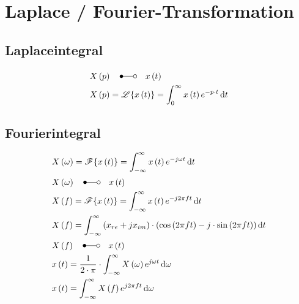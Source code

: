\section{Laplace / Fourier-Transformation}

\subsection*{Laplaceintegral}
\begin{align*}
&X\left(p\right) \quad \Laplace \quad x\left(t\right)\\
&X\left(p\right) =\mathscr{L}\{x\left(t\right)\}=\int_{0}^{\infty}x\left(t\right)e^{-p\cdot t}\diff
t
\end{align*}

\subsection*{Fourierintegral}
\begin{align*}
&X\left(\omega\right)=\mathscr{F}\{x\left(t\right)\}=\int_{-\infty}^{\infty}x\left(t\right)e^{-j\omega t}\diff t\\
&X\left(\omega\right) \quad \Laplace \quad x\left(t\right)\\
&X\left(f\right) =\mathscr{F}\{x\left(t\right)\}=\int_{-\infty}^{\infty}x\left(t\right)e^{-j2\pi f
t}\diff t\\
&X\left(f\right) =\int_{-\infty}^\infty\left(x_{re}+jx_{im}\right)\cdot\left(\cos\left(2\pi f
t\right)-j\cdot\sin\left(2\pi f t\right)\right)\diff t\\
&X\left(f\right) \quad \Laplace \quad x\left(t\right)\\
&x\left(t\right) =\frac{1}{2\cdot\pi}\cdot\int_{-\infty}^{\infty}X\left(\omega\right)e^{j\omega
t}\diff \omega\\
&x\left(t\right) =\int_{-\infty}^{\infty}X\left(f \right)e^{j2\pi f t}\diff \omega
\end{align*}

